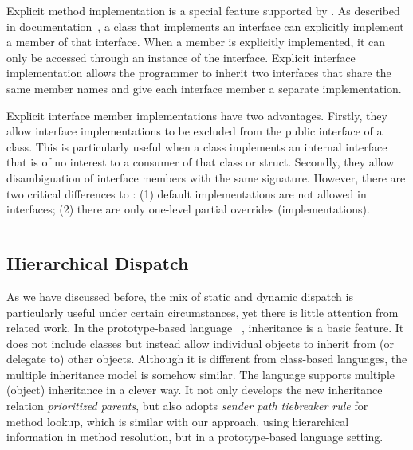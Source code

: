 Explicit method implementation is a special feature supported by \csharp{}. As described in \csharp{}
documentation~\cite{csharpdoc}, a class that implements an interface can explicitly implement a member of that
interface. When a member is explicitly implemented, it can only be accessed through an instance
of the interface. Explicit interface implementation allows the programmer to inherit two interfaces 
that share the same member names and give each interface member a separate implementation.

Explicit interface member implementations have two advantages.
Firstly, they allow interface implementations to be excluded 
from the public interface of a class. This is particularly useful when a class implements an internal 
interface that is of no interest to a consumer of that class or struct.
Secondly, they allow disambiguation of interface members with the 
same signature. However, there are two critical differences to \MIM{}:
(1) default implementations are not allowed in \csharp{} interfaces; 
(2) there are only one-level partial overrides (implementations).

\begin{lstlisting}
\end{lstlisting}

\subsection{Hierarchical Dispatch}
As we have discussed before, the mix of static and dynamic dispatch is particularly useful under certain circumstances,
yet there is little attention from related work. In the prototype-based language \self~\cite{Chambers1991}, inheritance is a basic feature.
It does not include classes but instead allow individual objects to inherit from (or delegate to) other objects. 
Although it is different from class-based languages, the multiple inheritance model is somehow similar. The \self{}
language supports multiple (object) inheritance in a clever way. It not only develops the new inheritance
relation \emph{prioritized parents}, but also adopts \emph{sender path tiebreaker rule} for method lookup, which is similar with our approach, using hierarchical information in method resolution, but in a prototype-based language setting.


